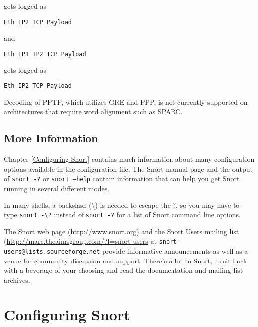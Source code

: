 \documentclass[english]{report}
\newenvironment{note}{
\samepage
    \vspace{10pt}{\textsf{
        {\hspace{7pt}\Huge{$\triangle$\hspace{-12.5pt}{\Large{$^!$}}}}\hspace{5pt}
        {\Large{NOTE}}
    }
    }
   \begin{center}
    \par\vspace{-17pt}

    \begin{lrbox}{\savepar}
    \begin{minipage}[r]{6in}
}
{
    \end{minipage}
    \end{lrbox}
    \fbox{
        \usebox{
            \savepar
	}
    }
    \par\vskip10pt
    \end{center}
}
\newenvironment{note}{
        \begin{rawhtml}
        <p><table border="1"><tr><td><b>
        Note:&nbsp;&nbsp;</b>
        \end{rawhtml}
}{
        \begin{rawhtml}
        </b></td></tr></table></p>
        \end{rawhtml}
}
\begin{document}
gets logged as

\begin{verbatim}
Eth IP2 TCP Payload
\end{verbatim}

and

\begin{verbatim}
Eth IP1 IP2 TCP Payload
\end{verbatim}

gets logged as

\begin{verbatim}
Eth IP2 TCP Payload
\end{verbatim}

\begin{note}
Decoding of PPTP, which utilizes GRE and PPP, is not currently supported on architectures
that require word alignment such as SPARC.
\end{note}



\section{More Information}

Chapter \ref{Configuring Snort} contains much information about many
configuration options available in the configuration file.  The Snort manual
page and the output of \texttt{snort -?} or \texttt{snort --help} contain
information that can help you get Snort running in several different modes.

\begin{note}
In many shells, a backslash (\textbackslash{}) is needed to escape the ?, so you may have to type 
\texttt{snort -\textbackslash{}?} instead of \texttt{snort -?} for a list of Snort command line options.
\end{note}

The Snort web page (\url{http://www.snort.org}) and the Snort Users mailing
list (\url{http://marc.theaimsgroup.com/?l=snort-users} at
\verb?snort-users@lists.sourceforge.net? provide informative announcements as
well as a venue for community discussion and support. There's a lot to Snort, so
sit back with a beverage of your choosing and read the documentation and
mailing list archives.

\newpage
\chapter{Configuring Snort \label{Configuring Snort}}
\end{document}
